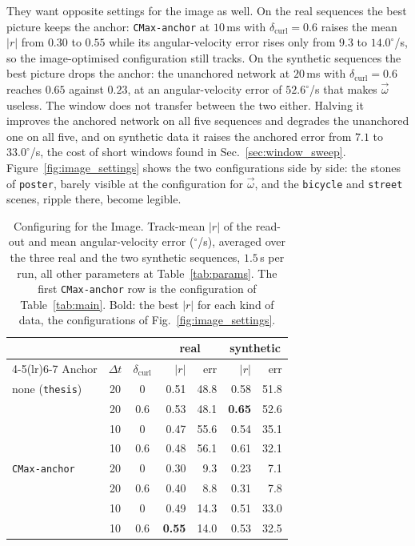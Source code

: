 \documentclass[journal]{IEEEtran}
\newcommand{\wvec}{\vec{\omega}}
\begin{document}
They want opposite settings for the image as well. On the real sequences the
best picture keeps the anchor: \texttt{CMax-anchor} at $10$\,ms with
$\delta_{\text{curl}} = 0.6$ raises the mean $|r|$ from $0.30$ to $0.55$ while
its angular-velocity error rises only from $9.3$ to $14.0^\circ$/s, so the
image-optimised configuration still tracks. On the synthetic sequences the best
picture drops the anchor: the unanchored network at $20$\,ms with
$\delta_{\text{curl}} = 0.6$ reaches $0.65$ against $0.23$, at an
angular-velocity error of $52.6^\circ$/s that makes $\wvec$ useless. The window
does not transfer between the two either. Halving it improves the anchored
network on all five sequences and degrades the unanchored one on all five, and
on synthetic data it raises the anchored error from $7.1$ to $33.0^\circ$/s,
the cost of short windows found in Sec.~\ref{sec:window_sweep}.
Figure~\ref{fig:image_settings} shows the two configurations side by side:
the stones of \texttt{poster}, barely visible at the configuration for
$\wvec$, and the \texttt{bicycle} and \texttt{street} scenes, ripple there,
become legible.

\begin{table}[!t]
\renewcommand{\arraystretch}{1.15}
\caption{Configuring for the Image. \textnormal{Track-mean $|r|$ of the
read-out and mean angular-velocity error ($^\circ$/s), averaged over the three
real and the two synthetic sequences, $1.5$\,s per run, all other parameters
at Table~\ref{tab:params}. The first \texttt{CMax-anchor} row is the
configuration of Table~\ref{tab:main}. Bold: the best $|r|$ for each kind of
data, the configurations of Fig.~\ref{fig:image_settings}.}}
\label{tab:image}
\centering
\footnotesize
\begin{tabular}{@{}lccrrrr@{}}
\toprule
 & & & \multicolumn{2}{c}{real} & \multicolumn{2}{c}{synthetic} \\
\cmidrule(lr){4-5}\cmidrule(lr){6-7}
Anchor & $\Delta t$ & $\delta_{\text{curl}}$ & $|r|$ & err & $|r|$ & err \\
\midrule
none (\texttt{thesis}) & 20 & 0   & 0.51 & 48.8 & 0.58 & 51.8 \\
                       & 20 & 0.6 & 0.53 & 48.1 & \textbf{0.65} & 52.6 \\
                       & 10 & 0   & 0.47 & 55.6 & 0.54 & 35.1 \\
                       & 10 & 0.6 & 0.48 & 56.1 & 0.61 & 32.1 \\
\midrule
\texttt{CMax-anchor}   & 20 & 0   & 0.30 & 9.3  & 0.23 & 7.1 \\
                       & 20 & 0.6 & 0.40 & 8.8  & 0.31 & 7.8 \\
                       & 10 & 0   & 0.49 & 14.3 & 0.51 & 33.0 \\
                       & 10 & 0.6 & \textbf{0.55} & 14.0 & 0.53 & 32.5 \\
\bottomrule
\end{tabular}
\end{table}
\end{document}
